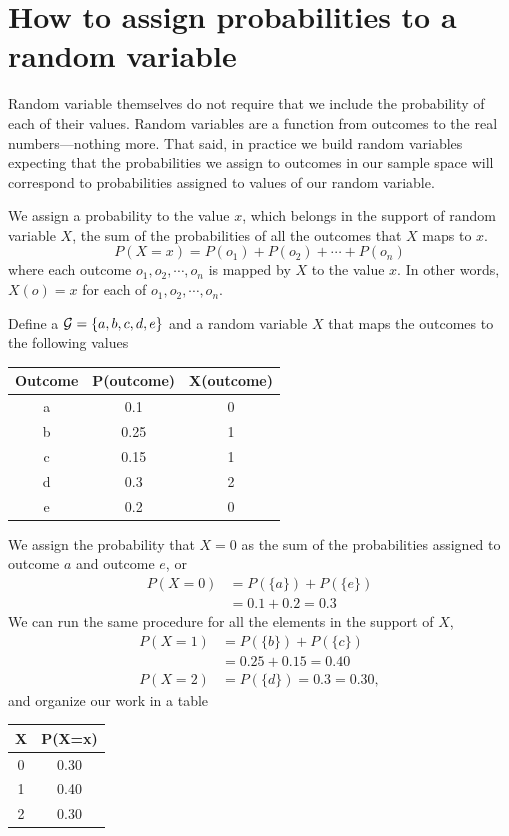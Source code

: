 \section{How to assign probabilities to a random variable}

Random variable themselves do not require that we include the probability of each of their values. Random variables are a function from outcomes to the real numbers---nothing more. 
That said, in practice we build random variables expecting that the probabilities we assign to outcomes in our sample space will correspond to probabilities assigned to values of our random variable.

We assign a probability to the value $x$, which belongs in the support of random variable $X$, the sum of the probabilities of all the outcomes that $X$ maps to $x$.
\begin{equation}
    P(X=x) = P(o_{1}) + P(o_{2}) + \cdots + P(o_{n})    
\end{equation}
where each outcome $o_{1},o_{2},\cdots,o_{n}$ is mapped by $X$ to the value $x$. In other words, $X(o)=x$ for each of $o_{1},o_{2},\cdots,o_{n}$.

\ex Define a $\mathcal{G} = \{a,b,c,d,e\}$ and a random variable $X$ that maps the outcomes to the following values
\begin{table}[ht!]
    \centering
    \begin{tabular}{ccc}
        Outcome & P(outcome) & X(outcome)  \\
        \hline
        a & 0.1  & 0\\
        b & 0.25 & 1\\
        c & 0.15 & 1\\
        d & 0.3  & 2\\
        e & 0.2  & 0\\
    \end{tabular}
\end{table}

We assign the probability that $X=0$ as the sum of the probabilities assigned to outcome $a$ and outcome $e$, or
\begin{align}
    P(X=0) &= P(\{a\}) + P(\{e\})\\
           &= 0.1+0.2 = 0.3
\end{align}
We can run the same procedure for all the elements in the support of $X$, 
\begin{align}
    P(X=1) &= P(\{b\}) + P(\{c\})\\
           &= 0.25+0.15 = 0.40\\
    P(X=2) &= P(\{d\}) = 0.3 = 0.30,
\end{align}
and organize our work in a table
\begin{table}[ht!]
    \centering
    \begin{tabular}{c|c}
        X & P(X=x) \\
        \hline
        0 & 0.30\\
        1 & 0.40\\
        2 & 0.30
    \end{tabular}
\end{table}

